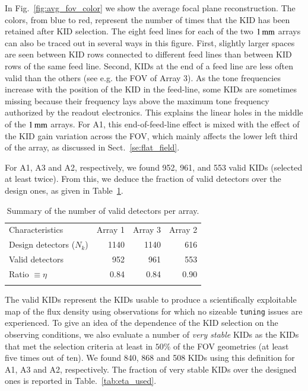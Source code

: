 \documentclass[traditionalabstract]{aa}
\newcommand{\lp}[1]{#1}
\begin{document}
In Fig.~\ref{fig:avg_fov_color} we show the average focal plane
reconstruction. The colors, from blue to red,
represent the number of times that the KID has been retained after
KID selection. The eight feed lines for each of the two
$1\,\rm{mm}$ arrays {\lp can also be traced out in several ways} in this
figure. First, slightly larger spaces are seen between KID rows
connected to different feed lines than between KID rows of the same
feed line. Second, KIDs at the end of a feed line are less often valid
than the others
(see e.g. the FOV of Array 3). As the tone frequencies
increase with the position of the KID in the feed-line, some KIDs are
sometimes missing because their frequency lays above the maximum tone
frequency authorized by the readout electronics. This explains the
linear holes in the middle of the $1\,\rm{mm}$ arrays. For A1, this
end-of-feed-line effect is mixed with the effect of the KID gain
variation across the FOV, which mainly affects the lower left third of
the array, as discussed in Sect.~\ref{se:flat_field}.

For A1, A3 and A2, respectively, we found 952, 961, and 553 valid KIDs
 (selected at least twice). From this, we deduce the fraction of
valid detectors over the design ones, as given in Table~\ref{tab:number_of_kids}.


\begin{table}[!htbp]
  \begin{center}
    \caption[Number of detectors]{Summary of the number of valid detectors per array.}
    \label{tab:number_of_kids}  
    \begin{tabular}{lrrr}
      \hline
      \hline
      \noalign{\smallskip}
      Characteristics & Array 1 & Array 3  & Array 2  \\
      \noalign{\smallskip}
      \hline
      \noalign{\smallskip}
      Design detectors ($N_k$)  & 1140  & 1140   & 616  \\
      Valid detectors           & 952   & 961    & 553  \\ 
      Ratio $\equiv \eta$       & 0.84  & 0.84   & 0.90   \\
      \noalign{\smallskip}
      \hline
    \end{tabular}
  \end{center}    
\end{table}


The valid KIDs represent the KIDs
usable to produce a scientifically exploitable map of the flux
density using observations for which no sizeable {\tt tuning}
issues are experienced. 
{\lp To give an idea of the dependence of the KID selection on the
observing conditions,} we also
evaluate a number of \emph{very stable} KIDs as the KIDs that met the
selection criteria at least in {\lp $50\%$} of the FOV geometries (at least
five times out of {\lp ten}). We
found 840, 868 and 508 KIDs using this definition for A1, A3 and A2,
respectively. The fraction of very stable KIDs over the designed ones
is reported in Table.~\ref{tab:eta_used}.
\end{document}
